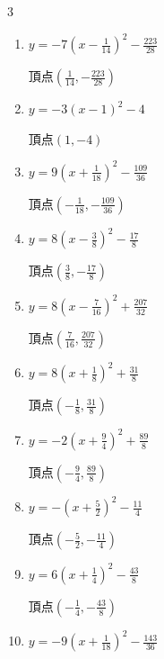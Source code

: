 \begin{multicols}{3}
\begin{enumerate}
        $\displaystyle 頂点\left( -\frac{7}{18} , -\frac{193}{36} \right)$

  \item $\displaystyle y=-7\left( x-\frac{1}{14}\right)^{2}-\frac{223}{28}$

        $\displaystyle 頂点\left( \frac{1}{14} , -\frac{223}{28} \right)$

  \item $\displaystyle y=-3\left( x-1\right)^{2}-4$

        $\displaystyle 頂点\left( 1 , -4 \right)$

\columnbreak %

\resetques

  \item $\displaystyle y=9\left( x+\frac{1}{18}\right)^{2}-\frac{109}{36}$

        $\displaystyle 頂点\left( -\frac{1}{18} , -\frac{109}{36} \right)$

  \item $\displaystyle y=8\left( x-\frac{3}{8}\right)^{2}-\frac{17}{8}$

        $\displaystyle 頂点\left( \frac{3}{8} , -\frac{17}{8} \right)$

  \item $\displaystyle y=8\left( x-\frac{7}{16}\right)^{2}+\frac{207}{32}$

        $\displaystyle 頂点\left( \frac{7}{16} , \frac{207}{32} \right)$

  \item $\displaystyle y=8\left( x+\frac{1}{8}\right)^{2}+\frac{31}{8}$

        $\displaystyle 頂点\left( -\frac{1}{8} , \frac{31}{8} \right)$

  \item $\displaystyle y=-2\left( x+\frac{9}{4}\right)^{2}+\frac{89}{8}$

        $\displaystyle 頂点\left( -\frac{9}{4} , \frac{89}{8} \right)$

  \item $\displaystyle y=-\left( x+\frac{5}{2}\right)^{2}-\frac{11}{4}$

        $\displaystyle 頂点\left( -\frac{5}{2} , -\frac{11}{4} \right)$

  \item $\displaystyle y=6\left( x+\frac{1}{4}\right)^{2}-\frac{43}{8}$

        $\displaystyle 頂点\left( -\frac{1}{4} , -\frac{43}{8} \right)$

  \item $\displaystyle y=-9\left( x+\frac{1}{18}\right)^{2}-\frac{143}{36}$


\end{enumerate}
\end{multicols}

